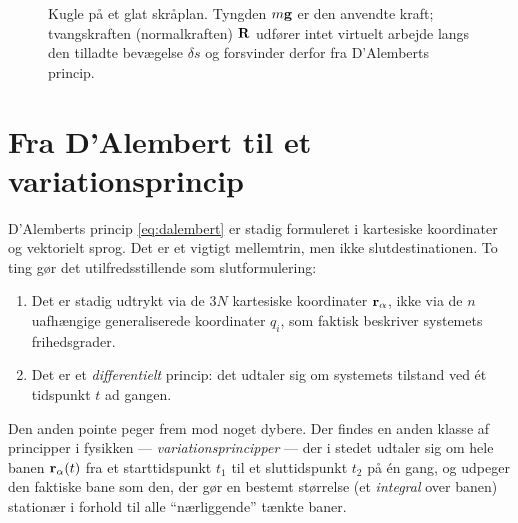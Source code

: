 \begin{figure}[htbp]
  \centering
  \caption{Kugle på et glat skråplan. Tyngden $m\vb{g}$ er den anvendte
  kraft; tvangskraften (normalkraften) $\vb{R}$ udfører intet virtuelt
  arbejde langs den tilladte bevægelse $\delta s$ og forsvinder derfor
  fra D'Alemberts princip.}
  \label{fig:skraaplan}
\end{figure}

\section{Fra D'Alembert til et variationsprincip}

D'Alemberts princip \eqref{eq:dalembert} er stadig formuleret i
kartesiske koordinater og vektorielt sprog. Det er et vigtigt
mellemtrin, men ikke slutdestinationen. To ting gør det utilfredsstillende
som slutformulering:

\begin{enumerate}
  \item Det er stadig udtrykt via de $3N$ kartesiske koordinater
        $\vb{r}_\alpha$, ikke via de $n$ uafhængige generaliserede
        koordinater $q_i$, som faktisk beskriver systemets frihedsgrader.
  \item Det er et \emph{differentielt} princip: det udtaler sig om
        systemets tilstand ved ét tidspunkt $t$ ad gangen.
\end{enumerate}

Den anden pointe peger frem mod noget dybere. Der findes en anden
klasse af principper i fysikken — \emph{variationsprincipper} — der i
stedet udtaler sig om hele banen $\vb{r}_\alpha(t)$ fra et starttidspunkt
$t_1$ til et sluttidspunkt $t_2$ på én gang, og udpeger den faktiske
bane som den, der gør en bestemt størrelse (et \emph{integral} over
banen) stationær i forhold til alle ``nærliggende'' tænkte baner.

